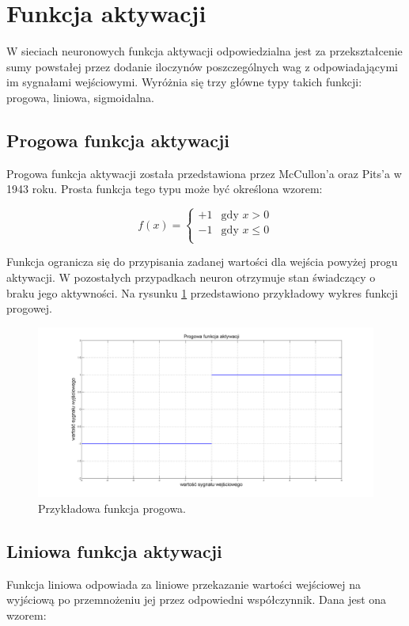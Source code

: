 \section{Funkcja aktywacji}
W sieciach neuronowych funkcja aktywacji odpowiedzialna jest za przekształcenie sumy powstałej przez dodanie iloczynów poszczególnych wag z odpowiadającymi im sygnałami wejściowymi. Wyróżnia się trzy główne typy takich funkcji: progowa, liniowa, sigmoidalna. 

\subsection{Progowa funkcja aktywacji}
Progowa funkcja aktywacji została przedstawiona przez McCullon'a oraz Pits'a w 1943 roku. Prosta funkcja tego typu może być określona wzorem:


$$ 
f(x) = \left\{ \begin{array}{ll}
+1 & \textrm{gdy $x>0$}\\
-1 & \textrm{gdy $x \le 0$}\\
\end{array} \right.
$$

Funkcja ogranicza się do przypisania zadanej wartości dla wejścia powyżej progu aktywacji. W pozostałych przypadkach neuron otrzymuje stan świadczący o braku jego aktywności. Na rysunku \ref{fig:step} przedstawiono przykładowy wykres funkcji progowej.

\begin{figure}[!htbp]
\centering
\includegraphics[width=1\linewidth]{./include/step}
\caption{Przykładowa funkcja progowa.}
\label{fig:step}
\end{figure}


\subsection{Liniowa funkcja aktywacji}
Funkcja liniowa odpowiada za liniowe przekazanie wartości wejściowej na wyjściową po przemnożeniu jej przez odpowiedni współczynnik. Dana jest ona wzorem:

